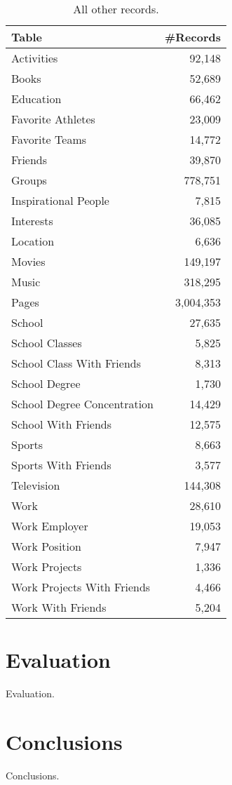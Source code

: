 \documentclass[letterpaper]{article}
\begin{document}
\begin{table}
\centering
\caption{\small All other records.}
\label{tab:all}
\begin{tabular}{|>{\small}l|>{\small}r|}
\hline
\textbf{Table} & \textbf{\#Records} \\
\hline
Activities & 92,148 \\
\hline
Books & 52,689 \\
\hline
Education & 66,462 \\
\hline
Favorite Athletes & 23,009 \\
\hline
Favorite Teams & 14,772 \\
\hline
Friends & 39,870 \\
\hline
Groups & 778,751 \\
\hline
Inspirational People & 7,815 \\
\hline
Interests & 36,085 \\
\hline
Location & 6,636 \\
\hline
Movies & 149,197 \\
\hline
Music & 318,295 \\
\hline
Pages & 3,004,353 \\
\hline
School & 27,635 \\
\hline
School Classes & 5,825 \\
\hline
School Class With Friends & 8,313 \\
\hline
School Degree & 1,730 \\
\hline
School Degree Concentration & 14,429 \\
\hline
School With Friends & 12,575 \\
\hline
Sports & 8,663 \\
\hline
Sports With Friends & 3,577 \\
\hline
Television & 144,308 \\
\hline
Work & 28,610 \\
\hline
Work Employer & 19,053 \\
\hline
Work Position & 7,947 \\
\hline
Work Projects & 1,336 \\
\hline
Work Projects With Friends & 4,466 \\
\hline
Work With Friends & 5,204 \\
\hline
\end{tabular}
\end{table}






\section{Evaluation}


Evaluation.


\section{Conclusions}


Conclusions.




\end{document}
